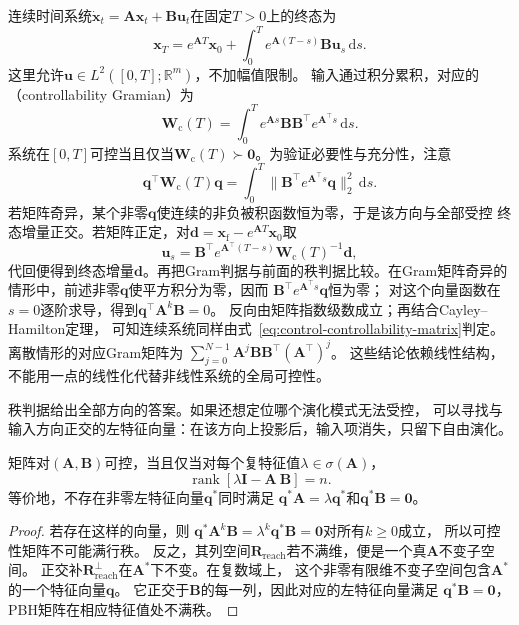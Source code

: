 连续时间系统$\dot{\bm x}_t=\bm A\bm x_t+\bm B\bm u_t$在固定$T>0$上的终态为
\[
  \bm x_T=e^{\bm A T}\bm x_0+
  \int_0^T e^{\bm A(T-s)}\bm B\bm u_s\,\mathrm ds.
\]
这里允许$\bm u\in L^2([0,T];\mathbb R^m)$，不加幅值限制。
输入通过积分累积，对应的（controllability Gramian）为
\begin{equation}
  \bm W_{\mathrm c}(T)=
  \int_0^T e^{\bm A s}\bm B\bm B^\top e^{\bm A^\top s}\,\mathrm ds.
  \label{eq:control-controllability-gramian}
\end{equation}
系统在$[0,T]$可控当且仅当$\bm W_{\mathrm c}(T)\succ\bm0$。为验证必要性与充分性，注意
\[
  \bm q^\top\bm W_{\mathrm c}(T)\bm q
  =\int_0^T\|\bm B^\top e^{\bm A^\top s}\bm q\|_2^2\,\mathrm ds.
\]
若矩阵奇异，某个非零$\bm q$使连续的非负被积函数恒为零，于是该方向与全部受控
终态增量正交。若矩阵正定，对$\bm d=\bm x_{\mathrm f}-e^{\bm A T}\bm x_0$取
\[
  \bm u_s=\bm B^\top e^{\bm A^\top(T-s)}\bm W_{\mathrm c}(T)^{-1}\bm d,
\]
代回便得到终态增量$\bm d$。再把Gram判据与前面的秩判据比较。在Gram矩阵奇异的情形中，前述非零$\bm q$使平方积分为零，因而
$\bm B^\top e^{\bm A^\top s}\bm q$恒为零；
对这个向量函数在$s=0$逐阶求导，得到$\bm q^\top\bm A^k\bm B=0$。
反向由矩阵指数级数成立；再结合Cayley--Hamilton定理，
可知连续系统同样由式~\eqref{eq:control-controllability-matrix}判定。
离散情形的对应Gram矩阵为
$\sum_{j=0}^{N-1}\bm A^j\bm B\bm B^\top(\bm A^\top)^j$。
这些结论依赖线性结构，不能用一点的线性化代替非线性系统的全局可控性。

秩判据给出全部方向的答案。如果还想定位哪个演化模式无法受控，
可以寻找与输入方向正交的左特征向量：在该方向上投影后，输入项消失，只留下自由演化。
\begin{theorem}
\label{thm:control-pbh-controllability}
矩阵对$(\bm A,\bm B)$可控，当且仅当对每个复特征值$\lambda\in\sigma(\bm A)$，
\begin{equation}
  \operatorname{rank}[\lambda\bm I-\bm A\ \bm B]=n.
  \label{eq:control-pbh-controllability}
\end{equation}
等价地，不存在非零左特征向量$\bm q^\ast$同时满足
$\bm q^\ast\bm A=\lambda\bm q^\ast$和$\bm q^\ast\bm B=\bm0$。
\end{theorem}
\begin{proof}
若存在这样的向量，则
$\bm q^\ast\bm A^k\bm B=\lambda^k\bm q^\ast\bm B=\bm0$对所有$k\geq0$成立，
所以可控性矩阵不可能满行秩。
反之，其列空间$\bm R_{\mathrm{reach}}$若不满维，便是一个真$\bm A$不变子空间。
正交补$\bm R_{\mathrm{reach}}^{\perp}$在$\bm A^\ast$下不变。在复数域上，
这个非零有限维不变子空间包含$\bm A^\ast$的一个特征向量$\bm q$。
它正交于$\bm B$的每一列，因此对应的左特征向量满足
$\bm q^\ast\bm B=\bm0$，PBH矩阵在相应特征值处不满秩。
\end{proof}

